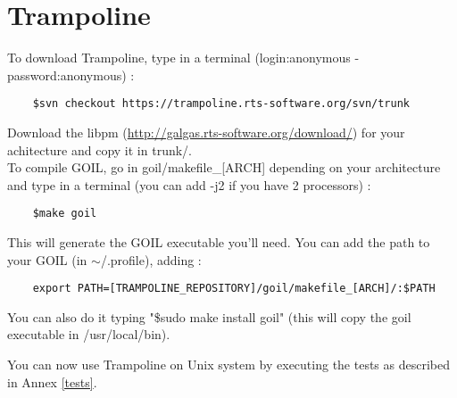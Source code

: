 


\section{Trampoline}
To download Trampoline, type in a terminal (login:anonymous - password:anonymous) :
	\begin{verbatim}
	$svn checkout https://trampoline.rts-software.org/svn/trunk
	\end{verbatim}
Download the libpm (\href{http://galgas.rts-software.org/download/}{http://galgas.rts-software.org/download/}) for your achitecture and copy it in trunk/.\\
To compile GOIL, go in goil/makefile\_[ARCH] depending on your architecture and type in a terminal (you can add -j2 if you have 2 processors) :
	\begin{verbatim}
	$make goil
	\end{verbatim}
This will generate the GOIL executable you'll need. You can add the path to your GOIL (in $\sim$/.profile), adding :
	\begin{verbatim}
	export PATH=[TRAMPOLINE_REPOSITORY]/goil/makefile_[ARCH]/:$PATH
	\end{verbatim}

You can also do it typing "\$sudo make install goil" (this will copy the goil executable in /usr/local/bin).

You can now use Trampoline on Unix system by executing the tests as described in Annex \ref{tests}.
